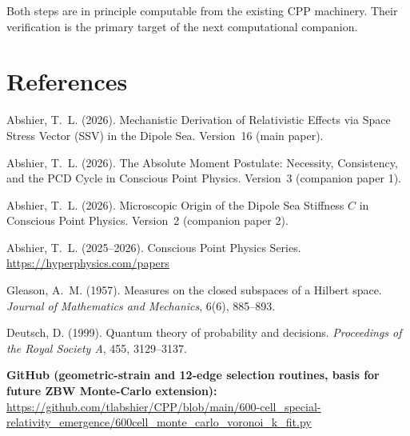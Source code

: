 \documentclass[12pt]{article}
\begin{document}
Both steps are in principle computable from the existing CPP machinery.
Their verification is the primary target of the next computational companion.

\section*{References}

\begin{enumerate}[label={[\arabic*]}]
  \item Abshier, T.~L. (2026).
    Mechanistic Derivation of Relativistic Effects via Space Stress Vector
    (SSV) in the Dipole Sea.  Version~16 (main paper).

  \item Abshier, T.~L. (2026).
    The Absolute Moment Postulate: Necessity, Consistency, and the PCD Cycle
    in Conscious Point Physics.  Version~3 (companion paper 1).

  \item Abshier, T.~L. (2026).
    Microscopic Origin of the Dipole Sea Stiffness $C$ in Conscious Point
    Physics.  Version~2 (companion paper 2).

  \item Abshier, T.~L. (2025--2026).
    Conscious Point Physics Series.
    \url{https://hyperphysics.com/papers}

  \item Gleason, A.~M. (1957).
    Measures on the closed subspaces of a Hilbert space.
    \textit{Journal of Mathematics and Mechanics}, 6(6), 885--893.

  \item Deutsch, D. (1999).
    Quantum theory of probability and decisions.
    \textit{Proceedings of the Royal Society A}, 455, 3129--3137.
\end{enumerate}

\bigskip
\noindent\textbf{GitHub (geometric-strain and 12-edge selection routines,
basis for future ZBW Monte-Carlo extension):}\\
\url{https://github.com/tlabshier/CPP/blob/main/600-cell_special-relativity_emergence/600cell_monte_carlo_voronoi_k_fit.py}
\end{document}

